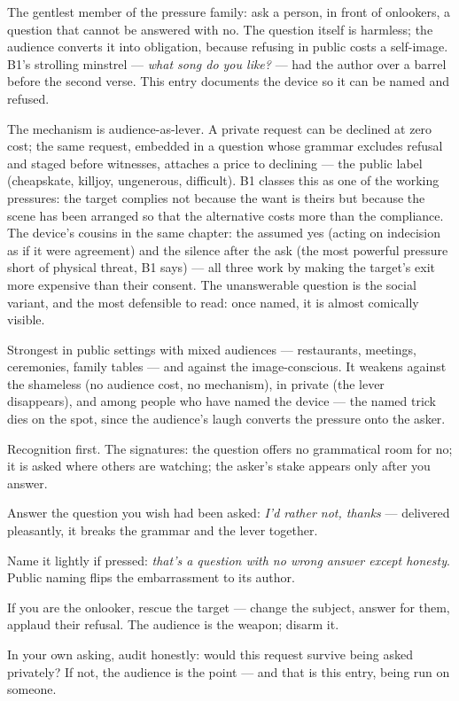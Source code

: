 \begin{core}
The gentlest member of the pressure family: ask a person, in front of onlookers, a question that cannot be answered with no. The question itself is harmless; the audience converts it into obligation, because refusing in public costs a self-image. B1's strolling minstrel --- \emph{what song do you like?} --- had the author over a barrel before the second verse. This entry documents the device so it can be named and refused.
\end{core}
\begin{mechanism}
The mechanism is audience-as-lever. A private request can be declined at zero cost; the same request, embedded in a question whose grammar excludes refusal and staged before witnesses, attaches a price to declining --- the public label (cheapskate, killjoy, ungenerous, difficult). B1 classes this as one of the working pressures: the target complies not because the want is theirs but because the scene has been arranged so that the alternative costs more than the compliance. The device's cousins in the same chapter: the assumed yes (acting on indecision as if it were agreement) and the silence after the ask (the most powerful pressure short of physical threat, B1 says) --- all three work by making the target's exit more expensive than their consent. The unanswerable question is the social variant, and the most defensible to read: once named, it is almost comically visible.
\end{mechanism}
\begin{conditions}
Strongest in public settings with mixed audiences --- restaurants, meetings, ceremonies, family tables --- and against the image-conscious. It weakens against the shameless (no audience cost, no mechanism), in private (the lever disappears), and among people who have named the device --- the named trick dies on the spot, since the audience's laugh converts the pressure onto the asker.
\end{conditions}
\begin{application}
  \item Recognition first. The signatures: the question offers no grammatical room for no; it is asked where others are watching; the asker's stake appears only after you answer.
  \item Answer the question you wish had been asked: \emph{I'd rather not, thanks} --- delivered pleasantly, it breaks the grammar and the lever together.
  \item Name it lightly if pressed: \emph{that's a question with no wrong answer except honesty}. Public naming flips the embarrassment to its author.
  \item If you are the onlooker, rescue the target --- change the subject, answer for them, applaud their refusal. The audience is the weapon; disarm it.
  \item In your own asking, audit honestly: would this request survive being asked privately? If not, the audience is the point --- and that is this entry, being run on someone.
\end{application}
